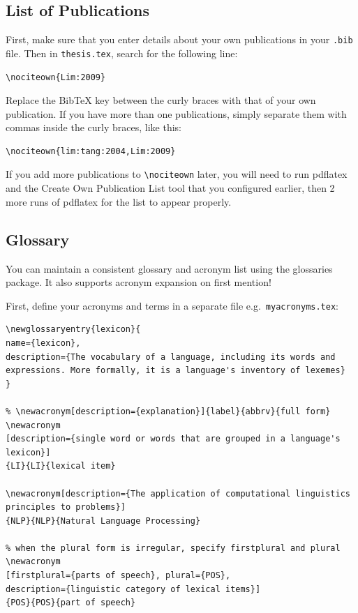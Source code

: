 \documentclass[a4paper,12pt]{scrartcl}
\begin{document}
\subsection{List of Publications}

First, make sure that you enter details about your own publications in your \verb|.bib| file.  Then in \verb|thesis.tex|, search for the following line:

\begin{lstlisting}
\nociteown{Lim:2009}
\end{lstlisting}

Replace the BibTeX key between the curly braces with that of your own publication.  If you have more than one publications, simply separate them with commas inside the curly braces, like this:

\begin{lstlisting}
\nociteown{lim:tang:2004,Lim:2009}
\end{lstlisting}

If you add more publications to \verb|\nociteown| later, you will need to run \textsf{pdflatex} and the \textsf{Create Own Publication List} tool that you configured earlier, then 2 more runs of \textsf{pdflatex} for the list to appear properly.



\subsection{Glossary}\label{sec:glossary}
You can maintain a consistent glossary and acronym list using the \textsf{glossaries} package. It also supports acronym expansion on first mention! {\large\smiley}

First, define your acronyms and terms in a separate file e.g.~\texttt{myacronyms.tex}:

\medskip

\begin{lstlisting}[moretexcs={newacronym,newglossaryentry},basicstyle=\ttfamily\small,
emph={name,description,plural,firstplural},emphstyle=\bfseries]
% \newglossaryentry{label}{name={term},description={explanation}}
\newglossaryentry{lexicon}{
name={lexicon},
description={The vocabulary of a language, including its words and expressions. More formally, it is a language's inventory of lexemes}
}

% \newacronym[description={explanation}]{label}{abbrv}{full form}
\newacronym
[description={single word or words that are grouped in a language's lexicon}]
{LI}{LI}{lexical item}

\newacronym[description={The application of computational linguistics principles to problems}]
{NLP}{NLP}{Natural Language Processing}

% when the plural form is irregular, specify firstplural and plural
\newacronym
[firstplural={parts of speech}, plural={POS},
description={linguistic category of lexical items}]
{POS}{POS}{part of speech}
\end{lstlisting}
\end{document}
